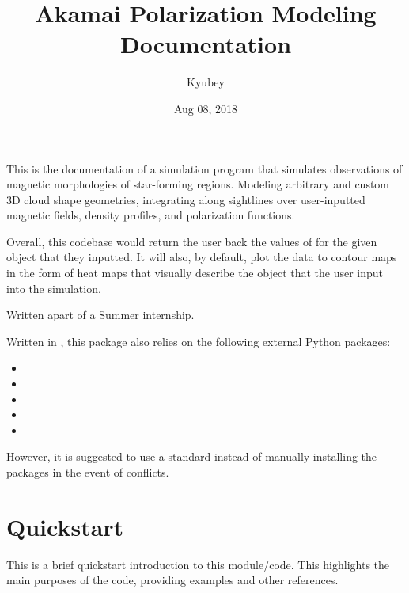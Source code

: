 \documentclass[letterpaper,10pt,english]{sphinxmanual}
\title{Akamai Polarization Modeling Documentation}
\date{Aug 08, 2018}
\author{Kyubey}
\begin{document}
\maketitle
\sphinxtableofcontents
{}\label{\detokenize{index::doc}}


This is the documentation of a simulation program that simulates observations of magnetic morphologies of star-forming regions. Modeling arbitrary and custom 3D cloud shape geometries, integrating along sightlines over user-inputted magnetic fields, density profiles, and polarization functions.

Overall, this codebase would return the user back the values of  for the given object that they inputted. It will also, by default, plot the data to contour maps in the form of heat maps that visually describe the object that the user input into the simulation.

Written apart of a  Summer internship.

Written in , this package also relies on the following external Python packages:
\begin{itemize}
\item {} 

\item {} 

\item {} 

\item {} 

\item {} 

\end{itemize}

However, it is suggested to use a standard  instead of manually installing the packages in the event of conflicts.


\chapter{Quickstart}
\label{\detokenize{quickstart:quickstart}}\label{\detokenize{quickstart::doc}}
This is a brief quickstart introduction to this module/code. This highlights the main purposes of the code, providing examples and other references.
\end{document}
